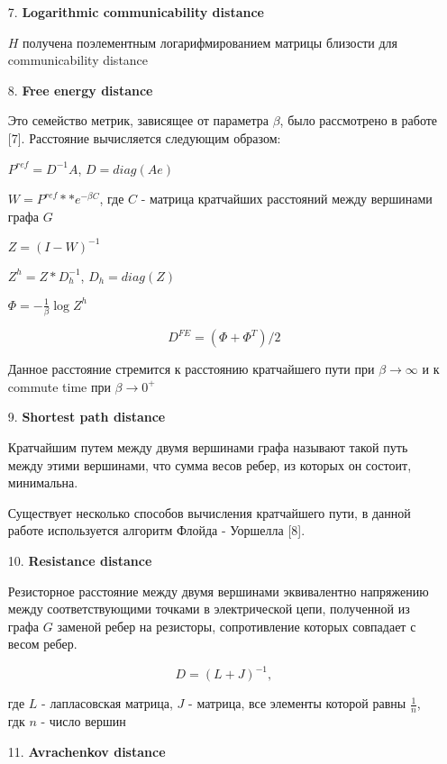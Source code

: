 \begin{itemize}
\item[7.] \textbf{Logarithmic communicability distance}

$H$ получена поэлементным логарифмированием матрицы близости для communicability distance

\item[8.] \textbf{Free energy distance}

Это семейство метрик, зависящее от параметра $\beta$, было рассмотрено в работе [7]. Расстояние вычисляется следующим образом:

$P^{ref} = D^{-1} A$, $D = diag(Ae)$

$W = P^{ref} ** e^{-\beta C}$, где $C$ - матрица кратчайших расстояний между вершинами графа $G$

$Z = (I-W)^{-1}$

$Z^h = Z * D_h^{-1}$, $D_h = diag(Z)$

$\Phi = -\frac{1}{\beta} \log Z^h$

\begin{equation}
D^{FE} = (\Phi + \Phi ^T)/ 2
\end{equation}

Данное расстояние стремится к расстоянию кратчайшего пути при $\beta \rightarrow \infty$ и к commute time при $\beta \rightarrow 0^+$

\item[9.] \textbf{Shortest path distance}

Кратчайшим путем между двумя вершинами графа называют такой путь между этими вершинами, что сумма весов ребер, из которых он состоит, минимальна.

Существует несколько способов вычисления кратчайшего пути, в данной работе используется алгоритм Флойда - Уоршелла [8].

\item[10.] \textbf{Resistance distance}

Резисторное расстояние между двумя вершинами эквивалентно напряжению между соответствующими точками в электрической цепи, полученной из графа $G$ заменой ребер на резисторы, сопротивление которых совпадает с весом ребер. 

\begin{equation}
D = (L + J)^{-1},
\end{equation}
 
где $L$ - лапласовская матрица, $J$ - матрица, все элементы которой равны $\frac {1}{n}$, гдк $n$ - число вершин

\item[11.] \textbf{Avrachenkov distance}


\end{itemize}
